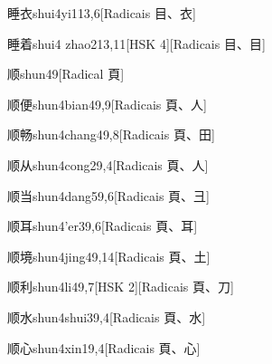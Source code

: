 \begin{entry}{睡衣}{shui4yi1}{13,6}[Radicais ⽬、⾐]
\end{entry}

\begin{entry}{睡着}{shui4 zhao2}{13,11}[HSK 4][Radicais ⽬、⽬]
\end{entry}

\begin{entry}{顺}{shun4}{9}[Radical ⾴]
\end{entry}

\begin{entry}{顺便}{shun4bian4}{9,9}[Radicais ⾴、⼈]
\end{entry}

\begin{entry}{顺畅}{shun4chang4}{9,8}[Radicais ⾴、⽥]
\end{entry}

\begin{entry}{顺从}{shun4cong2}{9,4}[Radicais ⾴、⼈]
\end{entry}

\begin{entry}{顺当}{shun4dang5}{9,6}[Radicais ⾴、⼹]
\end{entry}

\begin{entry}{顺耳}{shun4'er3}{9,6}[Radicais ⾴、⽿]
\end{entry}

\begin{entry}{顺境}{shun4jing4}{9,14}[Radicais ⾴、⼟]
\end{entry}

\begin{entry}{顺利}{shun4li4}{9,7}[HSK 2][Radicais ⾴、⼑]
\end{entry}

\begin{entry}{顺水}{shun4shui3}{9,4}[Radicais ⾴、⽔]
\end{entry}

\begin{entry}{顺心}{shun4xin1}{9,4}[Radicais ⾴、⼼]
\end{entry}

